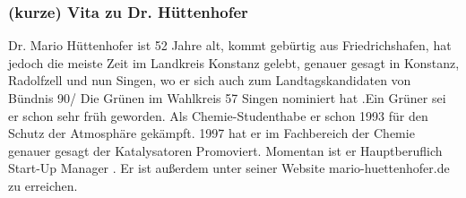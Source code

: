 \subsubsection{(kurze) Vita zu Dr. Hüttenhofer}
Dr. Mario Hüttenhofer ist 52 Jahre alt, kommt gebürtig aus Friedrichshafen, hat jedoch die meiste Zeit im Landkreis Konstanz gelebt, genauer gesagt in Konstanz, Radolfzell und nun Singen, wo er sich auch zum Landtagskandidaten von Bündnis 90/ Die Grünen im Wahlkreis 57 Singen nominiert hat \cite{Huettenhofer}.Ein Grüner sei er schon sehr früh geworden. Als Chemie-Studenthabe er schon 1993 für den Schutz der Atmosphäre gekämpft. 1997 hat er im Fachbereich der Chemie genauer gesagt der \glqq Katalysatoren \grqq{}Promoviert. Momentan ist er Hauptberuflich \glqq Start-Up Manager \grqq{}. Er ist außerdem unter seiner Website \glqq mario-huettenhofer.de\grqq{} zu erreichen.
\newpage
